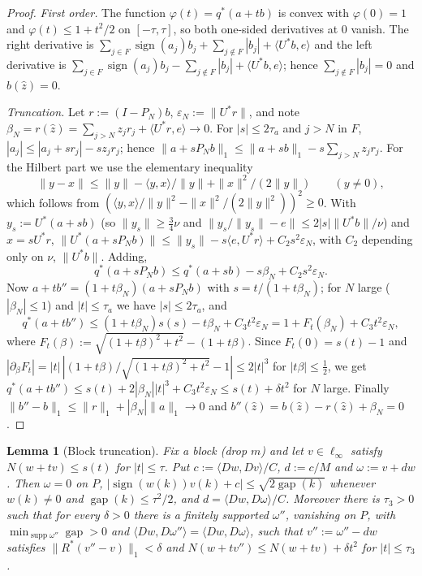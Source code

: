 \documentclass[10pt]{amsart}
\newtheorem{lemma}[theorem]{Lemma}
\theoremstyle{definition}
\theoremstyle{remark}
\newcommand{\supp}{\operatorname{supp}}
\newcommand{\sgn}{\operatorname{sign}}
\newcommand{\gap}{\operatorname{gap}}
\newcommand{\zh}{\hat z}
\newcommand{\ip}[2]{\langle #1,#2\rangle}
\begin{document}
\begin{proof}
\emph{First order.}  The function $\varphi(t)=q^*(a+tb)$ is convex with
$\varphi(0)=1$ and $\varphi(t)\le1+t^2/2$ on $[-\tau,\tau]$, so both one-sided
derivatives at $0$ vanish.  The right derivative is
$\sum_{j\in F}\sgn(a_j)b_j+\sum_{j\notin F}|b_j|+\ip{U^*b}{e}$ and the left
derivative is $\sum_{j\in F}\sgn(a_j)b_j-\sum_{j\notin
F}|b_j|+\ip{U^*b}{e}$; hence $\sum_{j\notin F}|b_j|=0$ and $b(\zh)=0$.

\emph{Truncation.}  Let $r:=(I-P_N)b$, $\varepsilon_N:=\|U^*r\|$, and note
$\beta_N=r(\zh)=\sum_{j>N}z_jr_j+\ip{U^*r}{e}\to0$.  For $|s|\le2\tau_a$ and
$j>N$ in $F$, $|a_j|\le|a_j+sr_j|-sz_jr_j$; hence
$\|a+sP_Nb\|_1\le\|a+sb\|_1-s\sum_{j>N}z_jr_j$.  For the Hilbert part we use
the elementary inequality
\begin{equation}\label{eq:hilbertineq}
 \|y-x\|\le\|y\|-\ip{y}{x}/\|y\|+\|x\|^2/(2\|y\|)\qquad(y\ne0),
\end{equation}
which follows from $(\ip{y}{x}/\|y\|^2-\|x\|^2/(2\|y\|^2))^2\ge0$.  With
$y_s:=U^*(a+sb)$ (so $\|y_s\|\ge\frac34\nu$ and
$\|y_s/\|y_s\|-e\|\le2|s|\|U^*b\|/\nu$) and $x=sU^*r$,
$\|U^*(a+sP_Nb)\|\le\|y_s\|-s\ip{e}{U^*r}+C_2s^2\varepsilon_N$, with $C_2$
depending only on $\nu$, $\|U^*b\|$.  Adding,
\[
 q^*(a+sP_Nb)\le q^*(a+sb)-s\beta_N+C_2s^2\varepsilon_N.
\]
Now $a+tb''=(1+t\beta_N)(a+sP_Nb)$ with $s=t/(1+t\beta_N)$; for $N$ large
($|\beta_N|\le1$) and $|t|\le\tau_a$ we have $|s|\le2\tau_a$, and
\[
 q^*(a+tb'')\le(1+t\beta_N)s(s)-t\beta_N+C_3t^2\varepsilon_N
 =1+F_t(\beta_N)+C_3t^2\varepsilon_N,
\]
where $F_t(\beta):=\sqrt{(1+t\beta)^2+t^2}-(1+t\beta)$.  Since $F_t(0)=
s(t)-1$ and $|\partial_\beta F_t|=|t|\,|(1+t\beta)/\sqrt{(1+t\beta)^2+t^2}-1|
\le2|t|^3$ for $|t\beta|\le\frac12$, we get $q^*(a+tb'')\le s(t)+
2|\beta_N||t|^3+C_3t^2\varepsilon_N\le s(t)+\delta t^2$ for $N$ large.
Finally $\|b''-b\|_1\le\|r\|_1+|\beta_N|\|a\|_1\to0$ and
$b''(\zh)=b(\zh)-r(\zh)+\beta_N=0$.
\end{proof}

\begin{lemma}[Block truncation]\label{lem:blocktrunc}
Fix a block \textup{(}drop $m$\textup{)} and let $v\in\ell_\infty$ satisfy
$N(w+tv)\le s(t)$ for $|t|\le\tau$.  Put $c:=\ip{Dw}{Dv}/C$, $d:=c/M$ and
$\omega:=v+dw$.  Then $\omega=0$ on $P$, $|\sgn(w(k))v(k)+c|\le
\sqrt{2\gap(k)}$ whenever $w(k)\neq0$ and $\gap(k)\le\tau^2/2$, and
$d=\ip{Dw}{D\omega}/C$.  Moreover there is $\tau_3>0$ such that for every
$\delta>0$ there is a finitely supported $\omega''$, vanishing on $P$, with
$\min_{\supp\omega''}\gap>0$ and $\ip{Dw}{D\omega''}=\ip{Dw}{D\omega}$, such
that $v'':=\omega''-dw$ satisfies $\|R^*(v''-v)\|_1<\delta$ and
$N(w+tv'')\le N(w+tv)+\delta t^2$ for $|t|\le\tau_3$.
\end{lemma}
\end{document}

